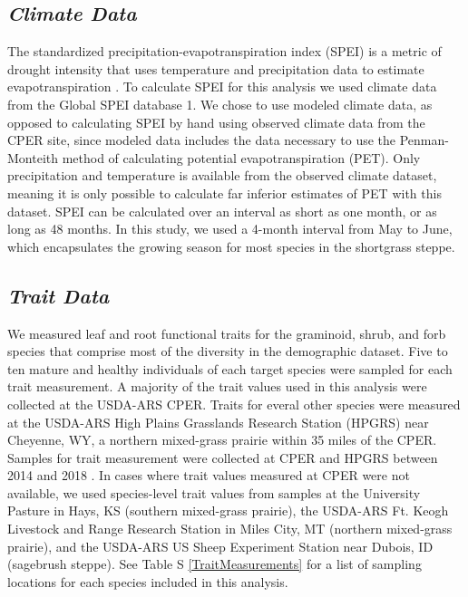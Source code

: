 \documentclass[12pt, letterpaper]{article}
\begin{document}
\subsection{\textit{Climate Data}} The standardized precipitation-evapotranspiration index (SPEI) is a metric of drought intensity that uses temperature and precipitation data to estimate evapotranspiration \citep{Vicente-Serrano2010}.  To calculate SPEI for this analysis we used climate data from the Global SPEI database 1\citep{Vicente-Serrano2010}. We chose to use modeled climate data, as opposed to calculating SPEI by hand using observed climate data from the CPER site, since modeled data includes the data necessary to use the Penman-Monteith method of calculating potential evapotranspiration (PET). Only precipitation and temperature is available from the observed climate dataset, meaning it is only possible to calculate far inferior estimates of PET with this dataset. SPEI can be calculated over an interval as short as one month, or as long as 48 months. In this study, we used a 4-month interval from May to June, which encapsulates the growing season for most species in the shortgrass steppe. 

\subsection{\textit{Trait Data}} We measured leaf and root functional traits for the graminoid, shrub, and forb species that comprise most of the diversity in the demographic dataset. Five to ten mature and healthy individuals of each target species were sampled for each trait measurement. A majority of the trait values used in this analysis were collected at the USDA-ARS CPER. Traits for everal other species were measured at the USDA-ARS High Plains Grasslands Research Station (HPGRS) near Cheyenne, WY, a northern mixed-grass prairie within 35 miles of the CPER. Samples for trait measurement were collected at CPER and HPGRS between 2014 and 2018 \citep{Blumenthal2020}. In cases where trait values measured at CPER were not available, we used species-level trait values from samples at the University Pasture in Hays, KS (southern mixed-grass prairie), the USDA-ARS Ft. Keogh Livestock and Range Research Station in Miles City, MT (northern mixed-grass prairie), and the USDA-ARS US Sheep Experiment Station near Dubois, ID (sagebrush steppe). See Table S \ref{TraitMeasurements} for a list of sampling locations for each species included in this analysis.  
\end{document}
